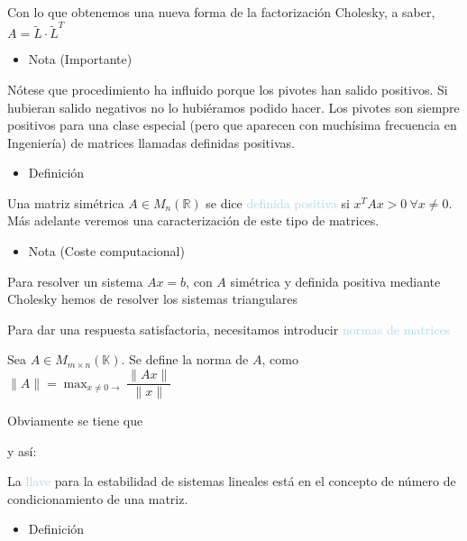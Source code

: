 \documentclass[12pt]{article}
\begin{document}
Con lo que obtenemos una nueva forma de la factorización
Cholesky, a saber, $A=\tilde{L}\cdot\tilde{L}^T$
\begin{itemize}[label=\color{red}\textbullet, leftmargin=*]
    \item \color{lightblue} Nota (Importante)
\end{itemize}
Nótese que procedimiento ha influido porque los pivotes han
salido positivos. Si hubieran salido negativos no lo hubiéramos
podido hacer. Los pivotes son siempre positivos para una clase
especial (pero que aparecen con muchísima frecuencia en
Ingeniería) de matrices llamadas definidas positivas.
\begin{itemize}[label=\color{red}\textbullet, leftmargin=*]
    \item \color{lightblue} Definición
\end{itemize}
Una matriz simétrica $A\in M_{n}(\mathbb{R})$ se dice
\textcolor{lightblue}{definida positiva} si $x^TAx>0~\forall
x\neq0$. Más adelante veremos una caracterización de este tipo
de matrices.
\begin{itemize}[label=\color{red}\textbullet, leftmargin=*]
    \item \color{lightblue} Nota (Coste computacional)
\end{itemize}
Para resolver un sistema $Ax=b$, con $A$ simétrica y definida
positiva mediante Cholesky hemos de resolver los sistemas
triangulares\begin{center}
\end{center}
Para dar una respuesta satisfactoria, necesitamos introducir
\textcolor{lightblue}{normas de matrices}

Sea $A\in M_{m\times n}(\mathbb{K})$. Se define la norma de $A$,
como $\|A\|=\max_{x\neq0\longrightarrow}\dfrac{\|Ax\|}{\|x\|}$

Obviamente se tiene que \begin{center}
\end{center}
y así: 

La \textcolor{lightblue}{llave} para la estabilidad de sistemas lineales está en el concepto de número de condicionamiento de una matriz.

\begin{itemize}[label=\color{red}\textbullet, leftmargin=*]
    \item \color{lightblue} Definición
\end{itemize}
\end{document}

